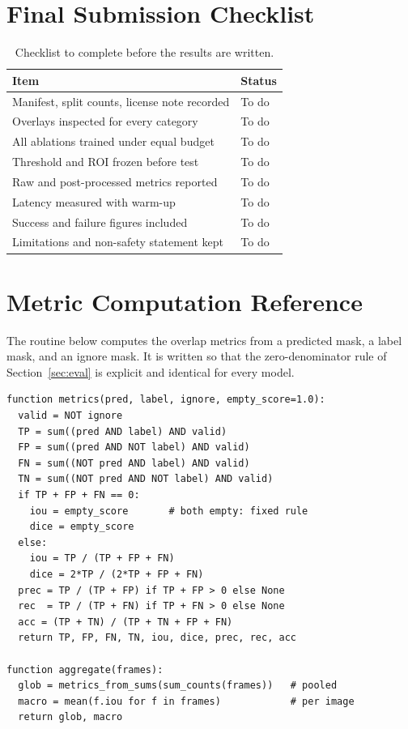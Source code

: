 \documentclass[10pt,a4paper,twocolumn]{article}
\begin{document}
\section{Final Submission Checklist}
\begin{table}[H]
\centering
\caption{Checklist to complete before the results are written.}
\footnotesize
\begin{tabular}{|l|l|}
\hline
\rowcolor{gray!18}\textbf{Item}&\textbf{Status}\\ \hline
Manifest, split counts, license note recorded & To do\\ \hline
Overlays inspected for every category & To do\\ \hline
All ablations trained under equal budget & To do\\ \hline
Threshold and ROI frozen before test & To do\\ \hline
Raw and post-processed metrics reported & To do\\ \hline
Latency measured with warm-up & To do\\ \hline
Success and failure figures included & To do\\ \hline
Limitations and non-safety statement kept & To do\\ \hline
\end{tabular}
\end{table}

\section{Metric Computation Reference}
The routine below computes the overlap metrics from a predicted mask, a label mask, and an ignore mask. It is written so that the zero-denominator rule of Section~\ref{sec:eval} is explicit and identical for every model.

\begin{lstlisting}[caption={Metric computation with explicit empty-frame handling.}]
function metrics(pred, label, ignore, empty_score=1.0):
  valid = NOT ignore
  TP = sum((pred AND label) AND valid)
  FP = sum((pred AND NOT label) AND valid)
  FN = sum((NOT pred AND label) AND valid)
  TN = sum((NOT pred AND NOT label) AND valid)
  if TP + FP + FN == 0:
    iou = empty_score       # both empty: fixed rule
    dice = empty_score
  else:
    iou = TP / (TP + FP + FN)
    dice = 2*TP / (2*TP + FP + FN)
  prec = TP / (TP + FP) if TP + FP > 0 else None
  rec  = TP / (TP + FN) if TP + FN > 0 else None
  acc = (TP + TN) / (TP + TN + FP + FN)
  return TP, FP, FN, TN, iou, dice, prec, rec, acc

function aggregate(frames):
  glob = metrics_from_sums(sum_counts(frames))   # pooled
  macro = mean(f.iou for f in frames)            # per image
  return glob, macro
\end{lstlisting}
\end{document}

